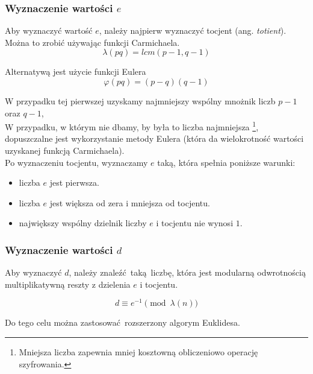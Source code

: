 \documentclass[12pt]{article}
\begin{document}
\subsubsection{Wyznaczenie wartości $e$}

Aby wyznaczyć wartość $e$, należy najpierw wyznaczyć tocjent (ang. \textit{totient}).
\\

Można to zrobić używając funkcji Carmichaela.
\begin{equation}
	\lambda (pq) = lcm(p-1, q-1)
\end{equation}

Alternatywą jest użycie funkcji Eulera
\begin{equation}
	\varphi (pq) = (p-q)(q-1)
\end{equation}

W przypadku tej pierwszej uzyskamy
najmniejszy wspólny mnożnik liczb $p-1$ oraz $q-1$,
\\

W przypadku, w którym nie dbamy, by była to liczba najmniejsza
\footnote{Mniejsza liczba zapewnia mniej kosztowną obliczeniowo operację
szyfrowania.},
dopuszczalne jest wykorzystanie metody Eulera (która da wielokrotność
wartości uzyskanej funkcją Carmichaela).
\\

Po wyznaczeniu tocjentu, wyznaczamy $e$ taką, która spełnia poniższe warunki:

\begin{itemize}
	\item liczba $e$ jest pierwsza.
	\item liczba $e$ jest większa od zera i mniejsza od tocjentu.
	\item największy wspólny dzielnik liczby $e$ i tocjentu nie wynosi $1$.
\end{itemize}

\newpage

\subsubsection{Wyznaczenie wartości $d$}

Aby wyznaczyć $d$, należy znaleźć taką liczbę,
która jest modularną odwrotnością multiplikatywną
reszty z dzielenia $e$ i tocjentu.

\begin{equation}
	d \equiv e^{{-1}} \pmod{\lambda (n)}
\end{equation}

Do tego celu można zastosować rozszerzony algorym Euklidesa.
\end{document}
